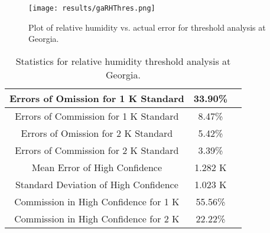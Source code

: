 \documentclass{book}
\begin{document}
\begin{minipage}[c]{0.47\textwidth}
\centering
\begin{figure}[H]
\texttt{[image: results/gaRHThres.png]}
\caption{Plot of relative humidity vs. actual error for threshold analysis at Georgia.}
\label{fig:gaRHThres}
\end{figure}
\end{minipage}
\begin{minipage}[c]{0.47\textwidth}
\begin{table}[H]
\centering
\footnotesize
\begin{tabular}{ | c | c | c | } \hline
Errors of Omission for 1 K Standard & 33.90\% \\ \hline
Errors of Commission for 1 K Standard & 8.47\% \\ \hline
Errors of Omission for 2 K Standard & 5.42\% \\ \hline
Errors of Commission for 2 K Standard & 3.39\% \\ \hline
Mean Error of High Confidence & 1.282 K \\ \hline
Standard Deviation of High Confidence & 1.023 K \\ \hline
Commission in High Confidence for 1 K & 55.56\% \\ \hline
Commission in High Confidence for 2 K & 22.22\% \\ \hline
\end{tabular}
\caption{Statistics for relative humidity threshold analysis at Georgia.}
\label{tab:gaRHThres}
\end{table}
\end{minipage}
\end{document}
